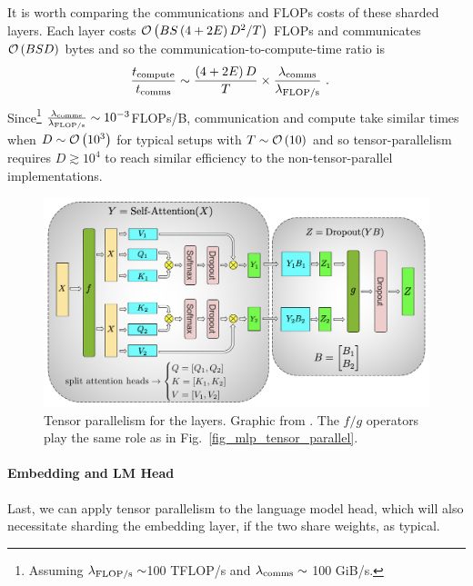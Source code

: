 \documentclass[11pt]{article}
\begin{document}
It is worth comparing the communications and FLOPs costs of these sharded layers. Each layer costs
$ \mathcal{O} \left(    BS \left ( 4+2E \right )  D ^{ 2 }/T \right)$ FLOPs and communicates
$ \mathcal{O} \left( BSD \right)  $ bytes and so the communication-to-compute-time ratio is
\begin{align}
  \frac{ t _{ {\rm  compute} } }{ t _{ {\rm  comms} } } & \sim  \frac{ \left ( 4+2E \right) D }{ T }\times \frac{ \lambda _{ {\rm comms} }  }{ \lambda _{ {\rm FLOP/s} }} \ .
\end{align}
Since\footnote{Assuming $ \lambda _{\rm  FLOP/s }\sim  $100 TFLOP/s and $ \lambda _{ {\rm comms} }
\sim $ 100 GiB/s.} $ \frac{ \lambda _{ {\rm comms} }  }{ \lambda _{ {\rm FLOP/s} }} \sim 10 ^{ -3 }
$FLOPs/B, communication and compute take similar times when  $ D \sim \mathcal{O} \left( 10 ^{ 3 } \right)
$ for typical setups with $ T \sim \mathcal{O} \left( 10 \right)  $ and so tensor-parallelism requires
$ D \gtrsim 10 ^{ 4 } $ to reach similar efficiency to the non-tensor-parallel implementations.


\begin{figure}[ht]
	\centering
	\includegraphics[scale=.45]{figures/attention_mp_2.png}
	\caption{Tensor parallelism for the  layers. Graphic from
		\cite{shoeybi2020megatronlm}. The $ f/g $ operators play the same role as in
		Fig.~\ref{fig_mlp_tensor_parallel}.}
	\label{fig_attn_tensor_parallel}
\end{figure}

\paragraph{Embedding and LM Head} Last, we can apply tensor parallelism to the language model head,
which will also necessitate sharding the embedding layer, if the two share weights, as typical.
\end{document}
